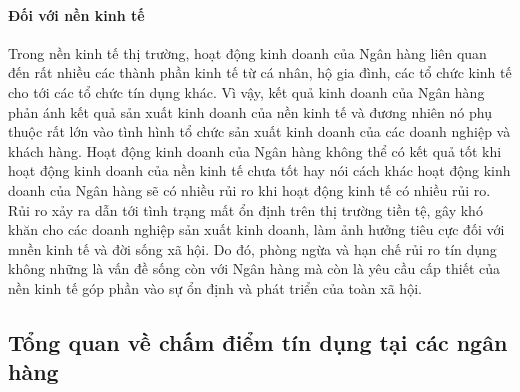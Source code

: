 \paragraph{Đối với nền kinh tế}
Trong nền kinh tế thị trường, hoạt động kinh doanh của Ngân hàng liên quan đến rất nhiều các thành phần kinh tế từ cá nhân, hộ gia đình, các tổ chức kinh tế cho tới các tổ chức tín dụng khác. Vì vậy, kết quả kinh doanh của Ngân hàng phản ánh kết quả sản xuất kinh doanh của nền kinh tế và đương nhiên nó phụ thuộc rất lớn vào tình hình tổ chức sản xuất kinh doanh của các doanh nghiệp và khách hàng. Hoạt động kinh doanh của Ngân hàng không thể có kết quả tốt khi hoạt động kinh doanh của nền kinh tế chưa tốt hay nói cách khác hoạt động kinh doanh của Ngân hàng sẽ có nhiều rủi ro khi hoạt động kinh tế có nhiều rủi ro. Rủi ro xảy ra dẫn tới tình trạng mất ổn định trên thị trường tiền tệ, gây khó khăn cho các doanh nghiệp sản xuất kinh doanh, làm ảnh hưởng tiêu cực đối với mnền kinh tế và đời sống xã hội. Do đó, phòng ngừa và hạn chế rủi ro tín dụng không những là vấn đề sống còn với Ngân hàng mà còn là yêu cầu cấp thiết của nền kinh tế góp phần vào sự ổn định và phát triển của toàn xã hội.



\subsection{Tổng quan về chấm điểm tín dụng tại các ngân hàng}
